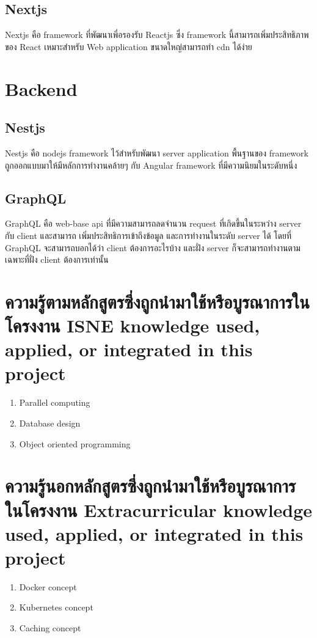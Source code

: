 \subsection{Nextjs}

Nextjs \cite{nextjs} คือ framework \cite{framework} ที่พัฒนาเพี่อรองรับ Reactjs \cite{reactjs} ซึ่ง framework นี้สามารถเพิ่มประสิทธิภาพของ React \cite{reactjs} เหมาะสำหรับ Web application ขนาดใหญ่สามารถทำ cdn \cite{cdn} ได้ง่าย

\section{Backend}

\subsection{Nestjs}

Nestjs \cite{nestjs} คือ nodejs \cite{nodejs} framework \cite{framework} ไว้สำหรับพัฒนา server application \cite {serverapplication} พื้นฐานของ framework ถูกออกแบบมาให้มีหลักการทำงานคล้ายๆ กับ Angular framework \cite{angular} ที่มีความนิยมในระดับหนึ่ง

\subsection{GraphQL}

GraphQL \cite{graphql} คือ web-base api \cite{webapi} ที่มีความสามารถลดจำนวน request ที่เกิดขึ้นในระหว่าง server กับ client และสามารถ เพิ่มประสิทธิการเข้าถึงข้อมูล และการทำงานในระดับ server ได้ โดยที่ GraphQL จะสามารถบอกได้ว่า client ต้องการอะไรบ้าง และฝั่ง server ก็จะสามารถทำงานตามเฉพาะที่ฝั่ง client ต้องการเท่านั้น

\section{\ifcpe%
ความรู้ตามหลักสูตรซึ่งถูกนำมาใช้หรือบูรณาการในโครงงาน
\else%
ISNE knowledge used, applied, or integrated in this project
\fi
}

\begin{enumerate}
    \item Parallel computing
    \item Database design
    \item Object oriented programming
\end{enumerate}

\section{\ifcpe%
ความรู้นอกหลักสูตรซึ่งถูกนำมาใช้หรือบูรณาการในโครงงาน
\else%
Extracurricular knowledge used, applied, or integrated in this project
\fi
}

\begin{enumerate}
    \item Docker concept
    \item Kubernetes concept
    \item Caching concept
\end{enumerate}
